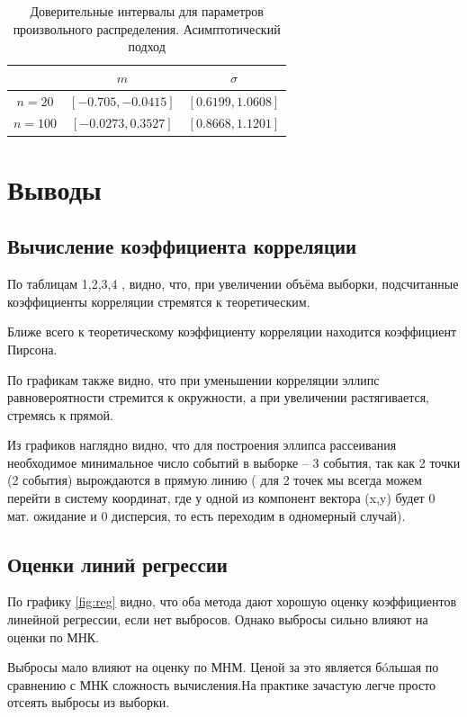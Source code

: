 \documentclass[a4]{article}
\begin{document}
\begin{table}[H]
	\caption{Доверительные интервалы для параметров произвольного распределения. Асимптотический подход}
	\label{tab:my_label1}
	\begin{center}
		\vspace{5mm}
		\begin{tabular}{|c|c|c|}
			\hline
			& $m$ & $\sigma$\\
			\hline
			$ n = 20 $ &	 $[-0.705, -0.0415]$ &	$ [0.6199, 1.0608] $\\
			\hline
			$ n = 100 $&	$[-0.0273, 0.3527]$& $ [0.8668, 1.1201] $\\
			\hline
		\end{tabular}
	\end{center}
\end{table}



\section{Выводы}
\subsection{Вычисление коэффициента корреляции}
По таблицам 1,2,3,4 , видно, что, при увеличении объёма выборки, подсчитанные коэффициенты корреляции стремятся к теоретическим.

Ближе всего к теоретическому коэффициенту корреляции находится коэффициент Пирсона.

По графикам также видно, что при уменьшении корреляции эллипс равновероятности стремится к окружности, а при увеличении растягивается, стремясь к прямой.

Из графиков наглядно видно, что для построения эллипса рассеивания необходимое минимальное число событий в выборке -- 3 события, так как 2 точки (2 события) вырождаются в прямую линию ( для 2 точек мы всегда можем перейти в систему координат, где у одной из компонент вектора (x,y) будет 0 мат. ожидание и 0 дисперсия, то есть переходим в одномерный случай).

\subsection{Оценки линий регрессии}
По графику \ref{fig:reg} видно, что оба метода дают хорошую оценку коэффициентов линейной регрессии, если нет выбросов. Однако выбросы сильно влияют на оценки по МНК.

Выбросы мало влияют на оценку по МНМ. Ценой за это является б\'oльшая по сравнению с МНК сложность вычисления.На практике зачастую легче просто отсеять выбросы из выборки.
\end{document}
